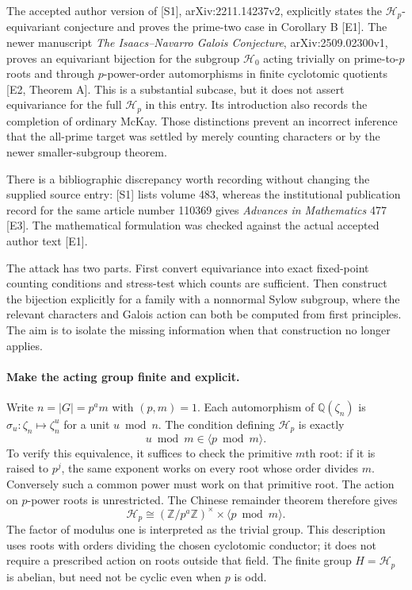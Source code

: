 \documentclass[11pt]{article}
\begin{document}
The accepted author version of [S1], arXiv:2211.14237v2, explicitly states
the $\mathcal H_p$-equivariant conjecture and proves the prime-two case in
Corollary B [E1]. The newer manuscript \emph{The Isaacs--Navarro Galois
Conjecture}, arXiv:2509.02300v1, proves an equivariant bijection for the
subgroup $\mathcal H_0$ acting trivially on prime-to-$p$ roots and through
$p$-power-order automorphisms in finite cyclotomic quotients [E2,
Theorem A]. This is a substantial subcase, but it does not assert
equivariance for the full $\mathcal H_p$ in this entry. Its introduction
also records the completion of ordinary McKay. Those distinctions prevent
an incorrect inference that the all-prime target was settled by merely
counting characters or by the newer smaller-subgroup theorem.

There is a bibliographic discrepancy worth recording without changing the
supplied source entry: [S1] lists volume 483, whereas the institutional
publication record for the same article number 110369 gives
\emph{Advances in Mathematics} 477 [E3]. The mathematical formulation
was checked against the actual accepted author text [E1].

The attack has two parts. First convert equivariance into exact fixed-point
counting conditions and stress-test which counts are sufficient. Then
construct the bijection explicitly for a family with a nonnormal Sylow
subgroup, where the relevant characters and Galois action can both be
computed from first principles. The aim is to isolate the missing
information when that construction no longer applies.

\paragraph{Make the acting group finite and explicit.}
Write $n=|G|=p^a m$ with $(p,m)=1$. Each automorphism of
$\mathbb Q(\zeta_n)$ is $\sigma_u:\zeta_n\mapsto\zeta_n^u$ for a
unit $u\bmod n$. The condition defining $\mathcal H_p$ is exactly
\[
 u\bmod m\in\langle p\bmod m\rangle.
\]
To verify this equivalence, it suffices to check the primitive $m$th root:
if it is raised to $p^j$, the same exponent works on every root whose
order divides $m$. Conversely such a common power must work on that
primitive root. The action on $p$-power roots is unrestricted. The Chinese
remainder theorem therefore gives
\begin{equation}\label{ra495:H}
 \mathcal H_p\cong
 (\mathbb Z/p^a\mathbb Z)^\times\times
                  \langle p\bmod m\rangle.
\end{equation}
The factor of modulus one is interpreted as the trivial group. This
description uses roots with orders dividing the chosen cyclotomic
conductor; it does not require a prescribed action on roots outside that
field. The finite group $H=\mathcal H_p$ is abelian, but need not be
cyclic even when $p$ is odd.
\end{document}
